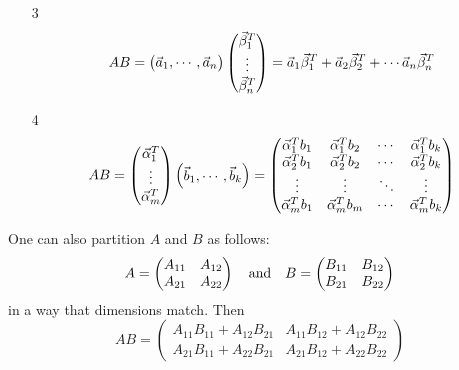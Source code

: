 \documentclass[pdf,9pt]{beamer}
\begin{document}
\begin{frame}[fragile]
    \begin{example}[continued]
    \begin{enumerate}
	\item[3]
    \[
	AB =
	\begin{pmatrix} \vec{a}_1,\cdots,\vec{a}_n \end{pmatrix}
	\begin{pmatrix} \vec{\beta}_1^T \cr \vdots\cr \vec{\beta}_n^T \end{pmatrix}
	=
	\vec{a}_1 \vec{\beta}_1^T +
	\vec{a}_2 \vec{\beta}_2^T +
	\cdots
	\vec{a}_n \vec{\beta}_n^T
    \]
    \vspace{3em}
\item[4]
    \[
	AB =
	\begin{pmatrix} \vec{\alpha}_1^T \cr \vdots\cr \vec{\alpha}_m^T \end{pmatrix}
	\begin{pmatrix} \vec{b}_1,\cdots,\vec{b}_k \end{pmatrix}
	=
	\begin{pmatrix}
	    \vec{\alpha}_1^T b_1 & \vec{\alpha}_1^T b_2 &\cdots & \vec{\alpha}_1^T b_k \\
	    \vec{\alpha}_2^T b_1 & \vec{\alpha}_2^T b_2 &\cdots & \vec{\alpha}_2^T b_k \\
	    \vdots & \vdots &\ddots & \vdots \\
	    \vec{\alpha}_m^T b_1 & \vec{\alpha}_m^T b_m &\cdots & \vec{\alpha}_m^T b_k \\
	\end{pmatrix}
    \]
    \end{enumerate}
    \end{example}
\end{frame}

\begin{frame}[fragile]
    \begin{example}[continued]
   One can also partition $A$ and $B$ as follows:
   \[
       A = \begin{pmatrix} A_{11} & A_{12}\cr A_{21} & A_{22} \end{pmatrix}
       \quad\text{and}\quad
       B = \begin{pmatrix} B_{11} & B_{12}\cr B_{21} & B_{22} \end{pmatrix}
   \]
   in a way that dimensions match. Then
   \[
       AB = \begin{pmatrix}
	   A_{11} B_{11} + A_{12} B_{21}  & A_{11} B_{12} + A_{12} B_{22}  \\
	   A_{21} B_{11} + A_{22} B_{21}  & A_{21} B_{12} + A_{22} B_{22}
       \end{pmatrix}
   \]
\end{example}
\end{frame}
\end{document}
